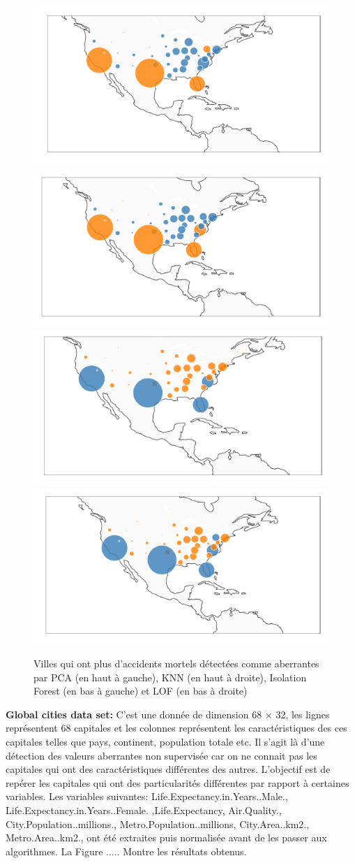 \begin{figure}[ht]
    \centering
    \includegraphics[width=.45\textwidth]{ADOA/Images/FatPCA.png}
    \includegraphics[width=.450\textwidth]{ADOA/Images/FatKNN.png}\\
    \includegraphics[width=.45\textwidth]{ADOA/Images/FatIsofore.png}
    \includegraphics[width=.450\textwidth]{ADOA/Images/FatLOF.png}
    \caption{Villes qui ont plus d'accidents mortels détectées comme aberrantes par PCA (en haut à gauche), KNN (en haut à droite), Isolation Forest (en bas à gauche) et LOF (en bas à droite)}%
    \label{fig2b}
\end{figure}

\newpage
\textbf{Global cities data set:} 
 C’est une donnée de dimension 68 $\times$ 32, les lignes représentent  68 capitales  et les colonnes représentent les caractéristiques  des ces capitales telles que pays, continent, population totale etc.   Il s’agit là d’une détection des valeurs aberrantes non supervisée car on ne connait pas les capitales qui ont des caractéristiques différentes des autres. L’objectif est de repérer les capitales qui ont des particularités différentes par rapport à certaines variables. Les variables suivantes:  Life.Expectancy.in.Years..Male., Life.Expectancy.in.Years..Female. ,Life.Expectancy, Air.Quality., City.Population..millions., Metro.Population..millions, City.Area..km2., Metro.Area..km2., ont été extraites puis normalisée avant de les passer aux algorithmes. La Figure ..... Montre les résultats obtenus.




